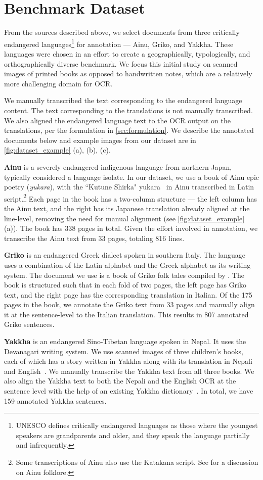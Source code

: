\section{Benchmark Dataset}
\label{sec:dataset}
From the sources described above, we select documents from three critically endangered languages\footnote{UNESCO defines critically endangered languages as those where the youngest speakers are grandparents and older, and they speak the language partially and infrequently.} for annotation --- Ainu, Griko, and Yakkha. These languages were chosen in an effort to create a geographically, typologically, and orthographically diverse benchmark. We focus this initial study on scanned images of printed books as opposed to handwritten notes, which are a relatively more challenging domain for OCR. 

We manually transcribed the text corresponding to the endangered language content. The text corresponding to the translations is not manually transcribed. We also aligned the endangered language text to the OCR output on the translations, per the formulation in \autoref{sec:formulation}. We describe the annotated documents below and example images from our dataset are in \autoref{fig:dataset_example} (a), (b), (c).

\smallskip
\textbf{Ainu} is a severely endangered indigenous language from northern Japan, typically considered a language isolate. In our dataset, we use a book of Ainu epic poetry (\textit{yukara}), with the ``Kutune Shirka" yukara~\cite{kindaichi1931ainu} in Ainu transcribed in Latin script.\footnote{Some transcriptions of Ainu also use the Katakana script. See \citet{howell1951classification} for a discussion on Ainu folklore.} Each page in the book has a two-column structure --- the left column has the Ainu text, and the right has its Japanese translation already aligned at the line-level, removing the need for manual alignment (see \autoref{fig:dataset_example} (a)). The book has 338 pages in total. Given the effort involved in annotation, we transcribe the Ainu text from 33 pages, totaling 816 lines.

\smallskip
\textbf{Griko} is an endangered Greek dialect spoken in southern Italy. The language uses a combination of the Latin alphabet and the Greek alphabet as its writing system. The document we use is a book of Griko folk tales compiled by \citet{stomeo1980racconti}. The book is structured such that in each fold of two pages, the left page has Griko text, and the right page has the corresponding translation in Italian. Of the 175 pages in the book, we annotate the Griko text from 33 pages and manually align it at the sentence-level to the Italian translation. This results in 807 annotated Griko sentences.

\smallskip
\textbf{Yakkha} is an endangered Sino-Tibetan language spoken in Nepal. It uses the Devanagari writing system. We use scanned images of three children's books, each of which has a story written in Yakkha along with its translation in Nepali and English~\cite{yakkha-elar}. We manually transcribe the Yakkha text from all three books. We also align the Yakkha text to both the Nepali and the English OCR at the sentence level with the help of an existing Yakkha dictionary~\cite{Schackow_2015}. In total, we have 159 annotated Yakkha sentences.
